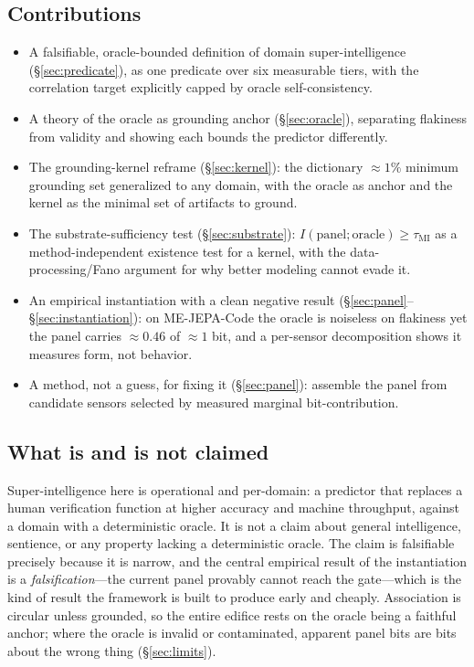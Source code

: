 \documentclass[10pt,twocolumn]{article}
\begin{document}
\subsection{Contributions}
\begin{itemize}\itemsep0.15em
\item A falsifiable, oracle-bounded definition of domain super-intelligence
(\S\ref{sec:predicate}), as one predicate over six measurable tiers, with the
correlation target explicitly capped by oracle self-consistency.
\item A theory of the oracle as grounding anchor (\S\ref{sec:oracle}), separating
flakiness from validity and showing each bounds the predictor differently.
\item The grounding-kernel reframe (\S\ref{sec:kernel}): the dictionary
$\approx1\%$ minimum grounding set generalized to any domain, with the oracle as
anchor and the kernel as the minimal set of artifacts to ground.
\item The substrate-sufficiency test (\S\ref{sec:substrate}):
$I(\text{panel};\text{oracle})\ge\tau_{\mathrm{MI}}$ as a method-independent
existence test for a kernel, with the data-processing/Fano argument for why
better modeling cannot evade it.
\item An empirical instantiation with a clean negative result
(\S\ref{sec:panel}--\S\ref{sec:instantiation}): on ME-JEPA-Code the oracle is
noiseless on flakiness yet the panel carries $\approx0.46$ of $\approx1$ bit, and
a per-sensor decomposition shows it measures form, not behavior.
\item A method, not a guess, for fixing it (\S\ref{sec:panel}): assemble the panel
from candidate sensors selected by measured marginal bit-contribution.
\end{itemize}

\subsection{What is and is not claimed}
Super-intelligence here is operational and per-domain: a predictor that replaces a
human verification function at higher accuracy and machine throughput, against a
domain with a deterministic oracle. It is not a claim about general intelligence,
sentience, or any property lacking a deterministic oracle. The claim is
falsifiable precisely because it is narrow, and the central empirical result of
the instantiation is a \emph{falsification}---the current panel provably cannot
reach the gate---which is the kind of result the framework is built to produce
early and cheaply. Association is circular unless grounded, so the entire edifice
rests on the oracle being a faithful anchor; where the oracle is invalid or
contaminated, apparent panel bits are bits about the wrong thing
(\S\ref{sec:limits}).
\end{document}
